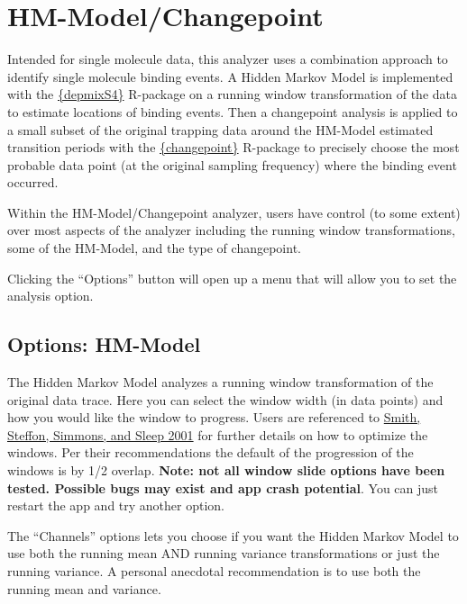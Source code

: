 \documentclass[
]{book}
\begin{document}
\section{HM-Model/Changepoint}\label{hm-modelchangepoint}

Intended for single molecule data, this analyzer uses a combination approach to identify single molecule binding events. A Hidden Markov Model is implemented with the \href{https://cran.r-project.org/web/packages/depmixS4/vignettes/depmixS4.pdf}{\{depmixS4\}} R-package on a running window transformation of the data to estimate locations of binding events. Then a changepoint analysis is applied to a small subset of the original trapping data around the HM-Model estimated transition periods with the \href{https://www.jstatsoft.org/article/view/v058i03}{\{changepoint\}} R-package to precisely choose the most probable data point (at the original sampling frequency) where the binding event occurred.

Within the HM-Model/Changepoint analyzer, users have control (to some extent) over most aspects of the analyzer including the running window transformations, some of the HM-Model, and the type of changepoint.

Clicking the ``Options'' button will open up a menu that will allow you to set the analysis option.

\subsection{Options: HM-Model}\label{options-hm-model}

The Hidden Markov Model analyzes a running window transformation of the original data trace. Here you can select the window width (in data points) and how you would like the window to progress. Users are referenced to \href{https://www.ncbi.nlm.nih.gov/pmc/articles/PMC1301746/pdf/11606292.pdf}{Smith, Steffon, Simmons, and Sleep 2001} for further details on how to optimize the windows. Per their recommendations the default of the progression of the windows is by 1/2 overlap. \textbf{Note: not all window slide options have been tested. Possible bugs may exist and app crash potential}. You can just restart the app and try another option.

The ``Channels'' options lets you choose if you want the Hidden Markov Model to use both the running mean AND running variance transformations or just the running variance. A personal anecdotal recommendation is to use both the running mean and variance.
\end{document}
